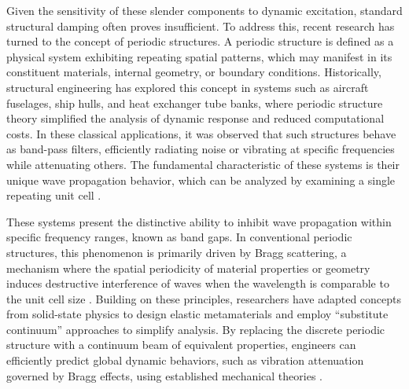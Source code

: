 Given the sensitivity of these slender components to dynamic excitation, standard structural damping often proves insufficient. To address this, recent research has turned to the concept of periodic structures. A periodic structure is defined as a physical system exhibiting repeating spatial patterns, which may manifest in its constituent materials, internal geometry, or boundary conditions. Historically, structural engineering has explored this concept in systems such as aircraft fuselages, ship hulls, and heat exchanger tube banks, where periodic structure theory simplified the analysis of dynamic response and reduced computational costs. In these classical applications, it was observed that such structures behave as band-pass filters, efficiently radiating noise or vibrating at specific frequencies while attenuating others. The fundamental characteristic of these systems is their unique wave propagation behavior, which can be analyzed by examining a single repeating unit cell \cite{hussein2014,SenGupta1980}.

These systems present the distinctive ability to inhibit wave propagation within specific frequency ranges, known as band gaps. In conventional periodic structures, this phenomenon is primarily driven by Bragg scattering, a mechanism where the spatial periodicity of material properties or geometry induces destructive interference of waves when the wavelength is comparable to the unit cell size . Building on these principles, researchers have adapted concepts from solid-state physics to design elastic metamaterials and employ ``substitute continuum'' approaches to simplify analysis. By replacing the discrete periodic structure with a continuum beam of equivalent properties, engineers can efficiently predict global dynamic behaviors, such as vibration attenuation governed by Bragg effects, using established mechanical theories \cite{MirandaJr2017,hussein2014}.


